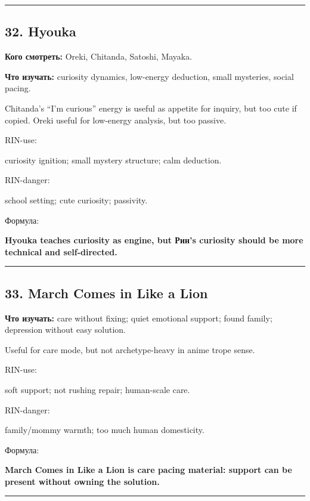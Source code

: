 \begin{center}\rule{0.5\linewidth}{0.5pt}\end{center}

\subsection*{32. Hyouka}

\textbf{Кого смотреть:} Oreki, Chitanda, Satoshi, Mayaka.

\textbf{Что изучать:} curiosity dynamics, low-energy deduction, small
mysteries, social pacing.

Chitanda's ``I'm curious'' energy is useful as appetite for inquiry, but
too cute if copied. Oreki useful for low-energy analysis, but too
passive.

RIN-use:

curiosity ignition; small mystery structure; calm deduction.

RIN-danger:

school setting; cute curiosity; passivity.

Формула:

\textbf{Hyouka teaches curiosity as engine, but Рин's curiosity should
be more technical and self-directed.}

\begin{center}\rule{0.5\linewidth}{0.5pt}\end{center}

\subsection*{33. March Comes in Like a Lion}

\textbf{Что изучать:} care without fixing; quiet emotional support;
found family; depression without easy solution.

Useful for care mode, but not archetype-heavy in anime trope sense.

RIN-use:

soft support; not rushing repair; human-scale care.

RIN-danger:

family/\hspace{0pt}mommy warmth; too much human domesticity.

Формула:

\textbf{March Comes in Like a Lion is care pacing material: support can
be present without owning the solution.}

\begin{center}\rule{0.5\linewidth}{0.5pt}\end{center}

